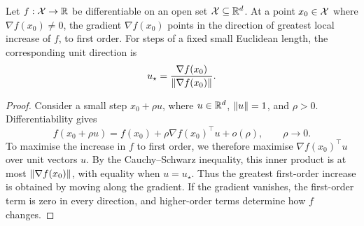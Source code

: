 \begin{proposition}
\label{prop:steepest_ascent}
Let $f:{\mathcal X}\to\mathbb{R}$ be differentiable on an open set ${\mathcal X}\subseteq\mathbb{R}^d$. At a point $x_0\in{\mathcal X}$ where $\nabla f(x_0)\neq0$, the gradient $\nabla f(x_0)$ points in the direction of greatest local increase of $f$, to first order. For steps of a fixed small Euclidean length, the corresponding unit direction is
\begin{equation}
    u_\star=\frac{\nabla f(x_0)}{\left\lVert\nabla f(x_0)\right\rVert}.
\end{equation}
\end{proposition}
\begin{proof}
Consider a small step $x_0+\rho u$, where $u\in\mathbb{R}^d$, $\left\lVert u\right\rVert=1$, and $\rho>0$. Differentiability gives
\begin{equation}
    f(x_0+\rho u)=f(x_0)+\rho\nabla f(x_0)^\top u+o(\rho),
    \qquad\rho\to0.
\end{equation}
To maximise the increase in $f$ to first order, we therefore maximise $\nabla f(x_0)^\top u$ over unit vectors $u$. By the Cauchy--Schwarz inequality, this inner product is at most $\left\lVert\nabla f(x_0)\right\rVert$, with equality when $u=u_\star$. Thus the greatest first-order increase is obtained by moving along the gradient. If the gradient vanishes, the first-order term is zero in every direction, and higher-order terms determine how $f$ changes.
\end{proof}

